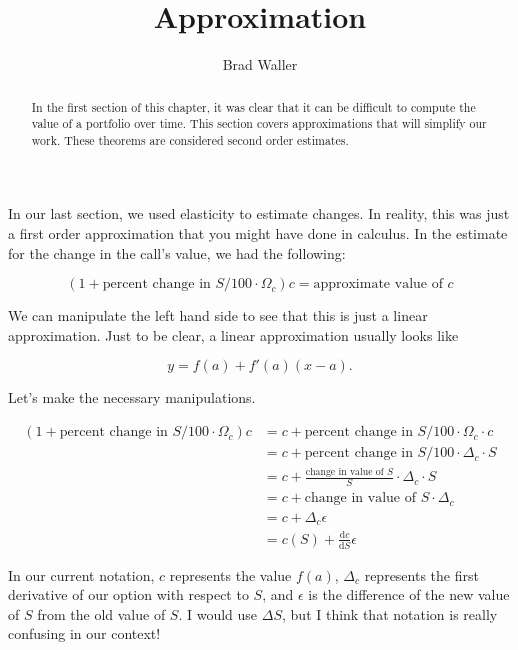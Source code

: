 \documentclass{ximera}
\author{Brad Waller}
\title{Approximation}
\begin{document}
\begin{abstract}
In the first section of this chapter, it was clear that it can be difficult to compute the value of a portfolio over time. This section covers approximations that will simplify our work. These theorems are considered second order estimates.
\end{abstract}

\maketitle

In our last section, we used elasticity to estimate changes. In reality, this was just a first order approximation that you might have done in calculus. In the estimate for the change in the call's value, we had the following:

\begin{equation*}
(1+\text{percent change in }S/100\cdot \Omega_c)c=\text{approximate value of }c
\end{equation*}

We can manipulate the left hand side to see that this is just a linear approximation. Just to be clear, a linear approximation usually looks like

\begin{equation*}
y=f(a)+f'(a)(x-a).
\end{equation*}

Let's make the necessary manipulations.

\begin{align*}
(1+\text{percent change in }S/100\cdot \Omega_c)c 	&=c+\text{percent change in }S/100\cdot \Omega_c\cdot c\\
									&=c+\text{percent change in }S/100\cdot \Delta_c\cdot S\\
									&=c+\frac{\text{change in value of }S}{S}\cdot\Delta_c\cdot S\\
									&=c+\text{change in value of }S\cdot\Delta_c\\
									&=c+\Delta_c\epsilon\\
									&=c(S)+\frac{\mathrm{d}c}{\mathrm{d}S}\epsilon
\end{align*}

In our current notation, $c$ represents the value $f(a)$, $\Delta_c$ represents the first derivative of our option with respect to $S$, and $\epsilon$ is the difference of the new value of $S$ from the old value of $S$. I would use $\Delta S$, but I think that notation is really confusing in our context!
\end{document}
